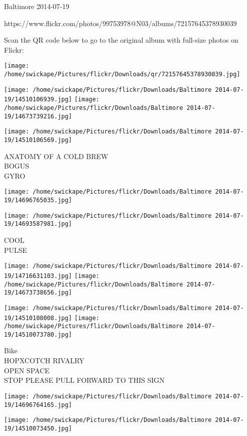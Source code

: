 \documentclass[10pt,letterpaper]{article}
\begin{document}
Baltimore 2014-07-19

https://www.flickr.com/photos/99753978@N03/albums/72157645378930039

Scan the QR code below to go to the original album with full-size photos on Flickr:

\texttt{[image: /home/swickape/Pictures/flickr/Downloads/qr/72157645378930039.jpg]}
\pagebreak

\texttt{[image: /home/swickape/Pictures/flickr/Downloads/Baltimore 2014-07-19/14510106939.jpg]}
\texttt{[image: /home/swickape/Pictures/flickr/Downloads/Baltimore 2014-07-19/14673739216.jpg]}

\vspace{0.25in}
\texttt{[image: /home/swickape/Pictures/flickr/Downloads/Baltimore 2014-07-19/14510106569.jpg]}

ANATOMY OF A COLD BREW\\
BOGUS\\
GYRO
\pagebreak

\texttt{[image: /home/swickape/Pictures/flickr/Downloads/Baltimore 2014-07-19/14696765035.jpg]}

\vspace{0.25in}
\texttt{[image: /home/swickape/Pictures/flickr/Downloads/Baltimore 2014-07-19/14693587981.jpg]}

COOL\\
PULSE
\pagebreak

\texttt{[image: /home/swickape/Pictures/flickr/Downloads/Baltimore 2014-07-19/14716631103.jpg]}
\texttt{[image: /home/swickape/Pictures/flickr/Downloads/Baltimore 2014-07-19/14673738656.jpg]}

\texttt{[image: /home/swickape/Pictures/flickr/Downloads/Baltimore 2014-07-19/14510108008.jpg]}
\texttt{[image: /home/swickape/Pictures/flickr/Downloads/Baltimore 2014-07-19/14510073780.jpg]}

Bike\\
HOPXCOTCH RIVALRY\\
OPEN SPACE\\
STOP PLEASE PULL FORWARD TO THIS SIGN
\pagebreak

\texttt{[image: /home/swickape/Pictures/flickr/Downloads/Baltimore 2014-07-19/14696764165.jpg]}

\vspace{0.25in}
\texttt{[image: /home/swickape/Pictures/flickr/Downloads/Baltimore 2014-07-19/14510073450.jpg]}
\end{document}
